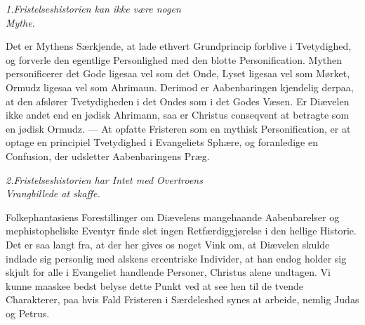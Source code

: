 \documentclass[12pt,a4paper]{book}
\begin{document}
\begin{center}
  \textit{1.}\quad\emph{Fristelseshistorien kan ikke være nogen\\
  Mythe.}
\end{center}

Det er Mythens Særkjende, at lade ethvert Grundprincip forblive i Tvetydighed, og
forverle den egentlige Personlighed med den blotte Personification. Mythen personificerer
det Gode ligesaa vel som det Onde, Lyset ligesaa vel som Mørket, Ormudz ligesaa vel som
Ahrimaun. Derimod er Aabenbaringen kjendelig derpaa,
at den afslører Tvetydigheden i det Ondes som i det Godes Væsen. Er Diævelen ikke andet
end en jødisk Ahrimann, saa er Christus conseqvent at betragte som en jødisk Ormudz. ---
At opfatte Fristeren som en mythisk Personification, er at optage en principiel
Tvetydighed i Evangeliets Sphære, og foranledige en Confusion, der udsletter
Aabenbaringens Præg.

\begin{center}
  \textit{2.}\quad\emph{Fristelseshistorien har Intet med Overtroens\\
  Vrangbillede at skaffe.}
\end{center}

Folkephantasiens Forestillinger om Diævelens mangehaande Aabenbarelser og
mephistopheliske Eventyr finde slet ingen Retfærdiggjørelse i den hellige Historie. Det
er saa langt fra, at der her gives os noget Vink om, at Diævelen skulde indlade sig
personlig med alskens ercentriske Individer, at han endog holder sig skjult for alle i
Evangeliet handlende Personer, Christus alene undtagen. Vi kunne maaskee bedst belyse
dette Punkt ved at see hen til de tvende Charakterer, paa hvis Fald Fristeren i
Særdeleshed synes at arbeide, nemlig Judas og Petrus.
\end{document}
